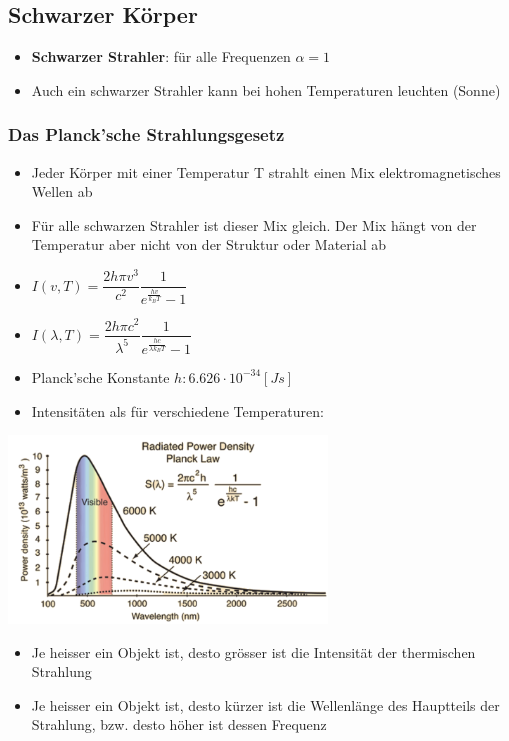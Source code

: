 \documentclass[8pt,a4paper]{scrartcl}
\begin{document}
\begin{multicols*}{3}
					\subsection{Schwarzer Körper}
						\begin{itemize}\itemsep0pt
							\item \textbf{Schwarzer Strahler}: für alle Frequenzen $\alpha = 1$ 
							\item Auch ein schwarzer Strahler kann bei hohen Temperaturen leuchten (Sonne)
						\end{itemize}	
						
						\subsubsection{Das Planck’sche Strahlungsgesetz}
							\begin{itemize}\itemsep0pt
								\item Jeder Körper mit einer Temperatur T strahlt einen Mix elektromagnetisches Wellen ab
								\item Für alle schwarzen Strahler ist dieser Mix gleich. Der Mix hängt von der Temperatur aber nicht von der Struktur oder Material ab
								\item $I(v,T)= \dfrac{2h\pi v^{3}}{c^{2}}\dfrac{1}{e^{\frac{hv}{k_{B}T}}-1}$
								\item $I(\lambda ,T)= \dfrac{2h\pi c^{2}}{\lambda^{5}}\dfrac{1}{e^{\frac{hc}{\lambda k_{B}T}}-1}$
								\item Planck'sche Konstante $h: 6.626\cdot 10^{-34} [Js] $
								\item Intensitäten als für verschiedene Temperaturen:
							\end{itemize}	
						
						
							\includegraphics[height=5cm]{img/planck.png} 
							\begin{itemize}\itemsep0pt
								\item Je heisser ein Objekt ist, desto grösser ist die Intensität der thermischen Strahlung
								\item Je heisser ein Objekt ist, desto kürzer ist die Wellenlänge des Hauptteils der Strahlung, bzw. desto höher ist dessen Frequenz


\end{itemize}
\end{multicols*}
\end{document}
